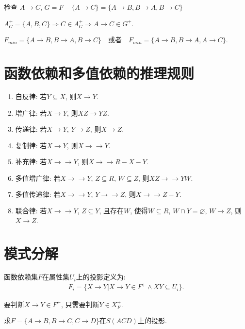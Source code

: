 检查 $A \rightarrow C$, $G = F - \{A \rightarrow C\} = \{A \rightarrow B, B \rightarrow A, B \rightarrow C\}$

$ A_G^+ = \{A, B, C\} \Rightarrow C \in A_G^+ \Rightarrow A \rightarrow C \in G^+ $.

$ F_{min} = \{A \rightarrow B, B \rightarrow A, B \rightarrow C\} \quad \text{或者} \quad F_{min} = \{A \rightarrow B, B \rightarrow A, A \rightarrow C\} $.


\section{函数依赖和多值依赖的推理规则}

\begin{enumerate}
    \item 自反律: 若$Y\subseteq X$, 则$X\to Y$.
    \item 增广律: 若$X\to Y$, 则$XZ\to YZ$.
    \item 传递律: 若$X\to Y$, $Y\to Z$, 则$X\to Z$.
    \item 复制律: 若$X\to Y$, 则$X\to\to Y$.
    \item 补充律: 若$X\to\to Y$, 则$X\to\to R-X-Y$.
    \item 多值增广律: 若$X\to\to Y$, $Z\subseteq R$, $W\subseteq Z$, 则$XZ\to\to YW$.
    \item 多值传递律: 若$X\to\to Y$, $Y\to\to Z$, 则$X\to\to Z-Y$.
    \item 联合律: 若$X\to\to Y$, $Z\subseteq Y$, 且存在$W$, 使得$W\subseteq R$, $W\cap Y=\varnothing$, $W\to Z$, 则$X\to Z$.
\end{enumerate}

\section{模式分解}

\begin{definition}[函数依赖在属性集上的投影]
  函数依赖集$F$在属性集$U_i$上的投影定义为:
  \begin{align*}
    F_i = \{X\to Y|X\to Y\in F^+ \land XY\subseteq U_i\}.
  \end{align*}
\end{definition}

\begin{remark}
  要判断$X\to Y\in F^+$, 只需要判断$Y\in X_F^+$.
\end{remark}

\begin{example}
  求$F=\{A\to B,B\to C,C\to D\}$在$S(ACD)$上的投影.
\end{example}

